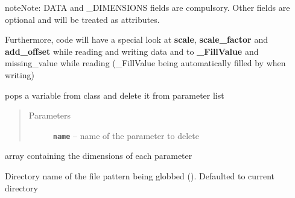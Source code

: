 \documentclass[letterpaper,10pt,english]{sphinxmanual}
\begin{document}
\begin{fulllineitems}
\begin{fulllineitems}
\begin{notice}{note}{Note:}
DATA and \_DIMENSIONS fields are compulsory.
Other fields are optional and will be treated as attributes.

Furthermore, code will have a special look at \textbf{scale}, \textbf{scale\_factor} and \textbf{add\_offset} while reading and writing data and to \textbf{\_FillValue} and missing\_value while reading (\_FillValue being automatically filled by  when writing)
\end{notice}

\end{fulllineitems}


\begin{fulllineitems}
\label{altimetry.data:altimetry.data.hydro_data.delete_Variable}
pops a variable from class and delete it from parameter list
\begin{quote}\begin{description}
\item[{Parameters}] \leavevmode
\textbf{\texttt{name}} -- name of the parameter to delete

\end{description}\end{quote}

\end{fulllineitems}


\begin{fulllineitems}
\label{altimetry.data:altimetry.data.hydro_data.dim_list}
array containing the dimensions of each parameter

\end{fulllineitems}


\begin{fulllineitems}
\label{altimetry.data:altimetry.data.hydro_data.dirname}
Directory name of the file pattern being globbed (\href{http://docs.python.org/library/glob.html\#glob.glob}{}). Defaulted to current directory

\end{fulllineitems}



\end{fulllineitems}
\end{document}
